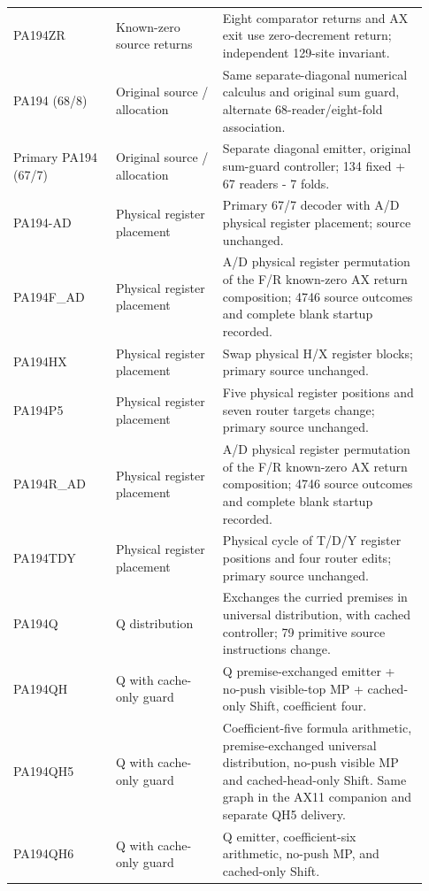 \begin{longtable}{>{\raggedright\arraybackslash}p{0.23\linewidth}>{\raggedright\arraybackslash}p{0.24\linewidth}>{\raggedright\arraybackslash}p{0.46\linewidth}}
PA194ZR&Known-zero source returns&Eight comparator returns and AX exit use zero-decrement return; independent 129-site invariant.\\[5pt]
PA194 (68/\allowbreak{}8)&Original source /\allowbreak{} allocation&Same separate-diagonal numerical calculus and original sum guard, alternate 68-reader/\allowbreak{}eight-fold association.\\[5pt]
Primary PA194 (67/\allowbreak{}7)&Original source /\allowbreak{} allocation&Separate diagonal emitter, original sum-guard controller; 134 fixed + 67 readers - 7 folds.\\[5pt]
PA194-AD&Physical register placement&Primary 67/\allowbreak{}7 decoder with A/\allowbreak{}D physical register placement; source unchanged.\\[5pt]
PA194F\_AD&Physical register placement&A/\allowbreak{}D physical register permutation of the F/\allowbreak{}R known-zero AX return composition; 4746 source outcomes and complete blank startup recorded.\\[5pt]
PA194HX&Physical register placement&Swap physical H/\allowbreak{}X register blocks; primary source unchanged.\\[5pt]
PA194P5&Physical register placement&Five physical register positions and seven router targets change; primary source unchanged.\\[5pt]
PA194R\_AD&Physical register placement&A/\allowbreak{}D physical register permutation of the F/\allowbreak{}R known-zero AX return composition; 4746 source outcomes and complete blank startup recorded.\\[5pt]
PA194TDY&Physical register placement&Physical cycle of T/\allowbreak{}D/\allowbreak{}Y register positions and four router edits; primary source unchanged.\\[5pt]
PA194Q&Q distribution&Exchanges the curried premises in universal distribution, with cached controller; 79 primitive source instructions change.\\[5pt]
PA194QH&Q with cache-only guard&Q premise-exchanged emitter + no-push visible-top MP + cached-only Shift, coefficient four.\\[5pt]
PA194QH5&Q with cache-only guard&Coefficient-five formula arithmetic, premise-exchanged universal distribution, no-push visible MP and cached-head-only Shift. Same graph in the AX11 companion and separate QH5 delivery.\\[5pt]
PA194QH6&Q with cache-only guard&Q emitter, coefficient-six arithmetic, no-push MP, and cached-only Shift.\\[5pt]

\end{longtable}
